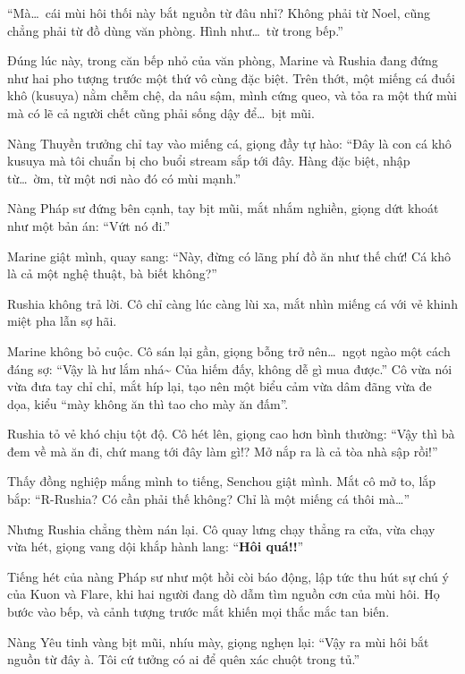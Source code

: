 \documentclass[../main.tex]{subfiles}
\begin{document}
``Mà\dots\ cái mùi hôi thối này bắt nguồn từ đâu nhỉ? Không phải từ Noel, cũng chẳng phải từ đồ dùng văn phòng. Hình như\dots\ từ trong bếp.''

Đúng lúc này, trong căn bếp nhỏ của văn phòng, Marine và Rushia đang đứng như hai pho tượng trước một thứ vô cùng đặc biệt. Trên thớt, một miếng cá đuối khô (kusuya) nằm chễm chệ, da nâu sậm, mình cứng queo, và tỏa ra một thứ mùi mà có lẽ cả người chết cũng phải sống dậy để\dots\ bịt mũi.


Nàng Thuyền trưởng chỉ tay vào miếng cá, giọng đầy tự hào: ``Đây là con cá khô kusuya mà tôi chuẩn bị cho buổi stream sắp tới đây. Hàng đặc biệt, nhập từ\dots\ ờm, từ một nơi nào đó có mùi mạnh.''

Nàng Pháp sư đứng bên cạnh, tay bịt mũi, mắt nhắm nghiền, giọng dứt khoát như một bản án: ``Vứt nó đi.''

Marine giật mình, quay sang: ``Này, đừng có lãng phí đồ ăn như thế chứ! Cá khô là cả một nghệ thuật, bà biết không?''

Rushia không trả lời. Cô chỉ càng lúc càng lùi xa, mắt nhìn miếng cá với vẻ khinh miệt pha lẫn sợ hãi.

Marine không bỏ cuộc. Cô sán lại gần, giọng bỗng trở nên\dots\ ngọt ngào một cách đáng sợ: ``Vậy là hư lắm nhá\~{} Của hiếm đấy, không dễ gì mua được.'' Cô vừa nói vừa đưa tay chỉ chỉ, mắt híp lại, tạo nên một biểu cảm vừa dâm đãng vừa đe dọa, kiểu ``mày không ăn thì tao cho mày ăn đấm''.

Rushia tỏ vẻ khó chịu tột độ. Cô hét lên, giọng cao hơn bình thường: ``Vậy thì bà đem về mà ăn đi, chứ mang tới đây làm gì!? Mở nắp ra là cả tòa nhà sập rồi!''

Thấy đồng nghiệp mắng mình to tiếng, Senchou giật mình. Mắt cô mở to, lắp bắp: ``R-Rushia? Có cần phải thế không? Chỉ là một miếng cá thôi mà\dots''

Nhưng Rushia chẳng thèm nán lại. Cô quay lưng chạy thẳng ra cửa, vừa chạy vừa hét, giọng vang dội khắp hành lang: ``\textbf{Hôi quá!!}''


Tiếng hét của nàng Pháp sư như một hồi còi báo động, lập tức thu hút sự chú ý của Kuon và Flare, khi hai người đang dò dẫm tìm nguồn cơn của mùi hôi. Họ bước vào bếp, và cảnh tượng trước mắt khiến mọi thắc mắc tan biến.

Nàng Yêu tinh vàng bịt mũi, nhíu mày, giọng nghẹn lại: ``Vậy ra mùi hôi bắt nguồn từ đây à. Tôi cứ tưởng có ai để quên xác chuột trong tủ.''
\end{document}
